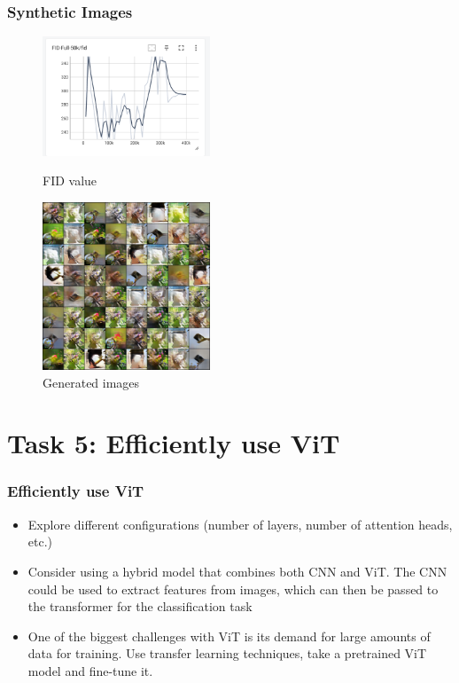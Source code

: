 \documentclass{beamer}
\begin{document}
        \begin{frame}
            \frametitle{Synthetic Images}
            \begin{figure}[H]
                \centering
                \begin{minipage}[t]{0.48\textwidth}
                \centering
                \includegraphics[width=5cm]{./img/pic2.png}
                \caption{FID value}
                \end{minipage}
                \begin{minipage}[t]{0.48\textwidth}
                \centering
                \includegraphics[width=5cm]{./img/pic3.png}
                \caption{Generated images}
                \end{minipage}
            \end{figure}\par
        \end{frame}
    \section{Task 5: Efficiently use ViT}
        \begin{frame}
            \frametitle{Efficiently use ViT}
            \begin{itemize}
                \item Explore different configurations (number of layers, number of attention heads, etc.)
                \item Consider using a hybrid model that combines both CNN and ViT. The CNN could be used to extract features from images, which can then be passed to the transformer for the classification task
                \item One of the biggest challenges with ViT is its demand for large amounts of data for training. Use transfer learning techniques, take a pretrained ViT model and fine-tune it.
            \end{itemize}\par
        \end{frame}
\end{document}
